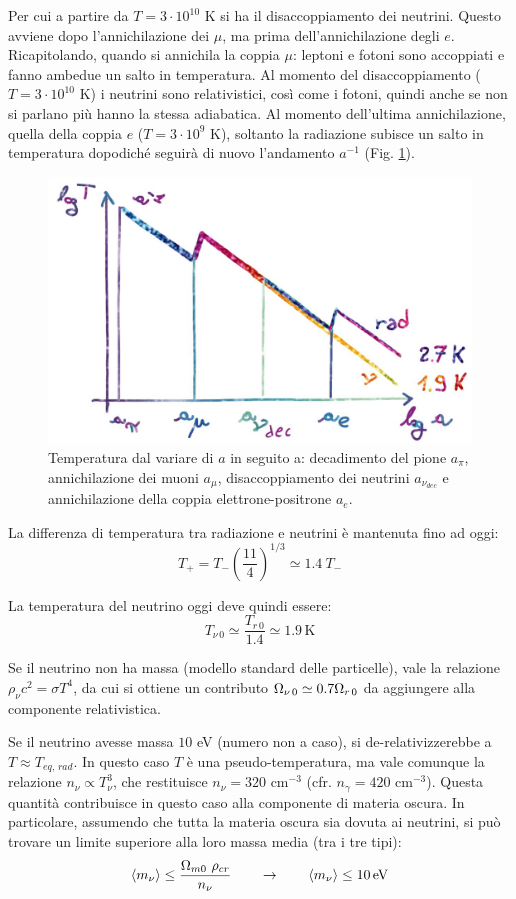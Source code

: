 Per cui a partire da $T= 3\cdot 10^{10}$ K si ha il disaccoppiamento dei neutrini. Questo avviene dopo l'annichilazione dei $\mu$, ma prima dell'annichilazione degli $e$. Ricapitolando, quando si annichila la coppia $\mu$: leptoni e fotoni sono accoppiati e fanno ambedue un salto in temperatura. Al momento del disaccoppiamento ($T=3\cdot 10^{10}$ K) i neutrini sono relativistici, così come i fotoni, quindi anche se non si parlano più hanno la stessa adiabatica. Al momento dell'ultima annichilazione, quella della coppia $e$ ($T=3\cdot 10^{9}$ K), soltanto la radiazione subisce un salto in temperatura dopodiché seguirà di nuovo l'andamento $a^{-1}$ (Fig. \ref{fig5:salti}). 


\begin{figure}[ht]
    \centering
    \includegraphics[width=.7 \textwidth]{Pictures/5/annichilazioni.jpg}
    \caption{Temperatura dal variare di $a$ in seguito a: decadimento del pione $a_\pi$, annichilazione dei muoni $a_\mu$, disaccoppiamento dei neutrini $a_{\nu_{dec}}$ e annichilazione della coppia elettrone-positrone $a_e$.}\label{fig5:salti}
\end{figure}


La differenza di temperatura tra radiazione e neutrini è mantenuta fino ad oggi:
$$
T_+ = T_- \left(\frac{11}{4} \right)^{1/3}\simeq 1.4 ~T_-
$$

La temperatura del neutrino oggi deve quindi essere:
$$
T_{\nu\, 0} \simeq \frac{T_{r\, 0}}{1.4} \simeq 1.9 \, \mathrm{K}
$$

Se il neutrino non ha massa (modello standard delle particelle), vale la relazione $\rho_\nu c^2 =\sigma T^4$, da cui si ottiene un contributo $\Omega_{\nu\, 0}\simeq 0.7 \Omega_{r\, 0}$ da aggiungere alla componente relativistica. 

Se il neutrino avesse massa $10$ eV (numero non a caso), si de-relativizzerebbe a $T\approx T_{eq,\, rad}$. In questo caso $T$ è una pseudo-temperatura, ma vale comunque la relazione $n_\nu \propto T_\nu^3$, che restituisce $n_\nu = 320$ cm$^{-3}$ (cfr. $n_\gamma=420$ cm$^{-3}$). Questa quantità contribuisce in questo caso alla componente di materia oscura. In particolare, assumendo che tutta la materia oscura sia dovuta ai neutrini, si può trovare un limite superiore alla loro massa media (tra i tre tipi):
$$
\left \langle m_\nu \right \rangle \le \frac{\Omega_{m0} ~\rho_{cr}}{n_\nu} \qquad \rightarrow\qquad \left \langle m_\nu \right \rangle \le 10\, \mathrm{eV}
$$

